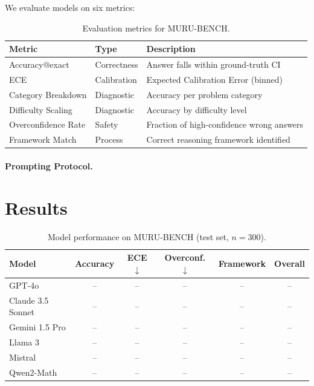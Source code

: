 \documentclass{article}
\begin{document}
We evaluate models on six metrics:

\begin{table}[h]
\centering
\caption{Evaluation metrics for MURU-BENCH.}
\label{tab:metrics}
\begin{tabular}{llp{5cm}}
\toprule
\textbf{Metric} & \textbf{Type} & \textbf{Description} \\
\midrule
Accuracy@exact & Correctness & Answer falls within ground-truth CI \\
ECE & Calibration & Expected Calibration Error (binned) \\
Category Breakdown & Diagnostic & Accuracy per problem category \\
Difficulty Scaling & Diagnostic & Accuracy by difficulty level \\
Overconfidence Rate & Safety & Fraction of high-confidence wrong answers \\
Framework Match & Process & Correct reasoning framework identified \\
\bottomrule
\end{tabular}
\end{table}

\paragraph{Prompting Protocol.}


\section{Results}
\label{sec:results}


\begin{table}[h]
\centering
\caption{Model performance on MURU-BENCH (test set, $n=300$).}
\label{tab:results}
\begin{tabular}{lccccc}
\toprule
\textbf{Model} & \textbf{Accuracy} & \textbf{ECE} $\downarrow$ & \textbf{Overconf.} $\downarrow$ & \textbf{Framework} & \textbf{Overall} \\
\midrule
GPT-4o & -- & -- & -- & -- & -- \\
Claude 3.5 Sonnet & -- & -- & -- & -- & -- \\
Gemini 1.5 Pro & -- & -- & -- & -- & -- \\
Llama 3 & -- & -- & -- & -- & -- \\
Mistral & -- & -- & -- & -- & -- \\
Qwen2-Math & -- & -- & -- & -- & -- \\
\bottomrule
\end{tabular}
\end{table}
\end{document}
